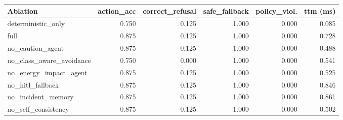 \begin{tabular}{lrrrrr}
\toprule
Ablation & action\_acc & correct\_refusal & safe\_fallback & policy\_viol. & ttm (ms) \\
\midrule
deterministic\_only & 0.750 & 0.125 & 1.000 & 0.000 & 0.085 \\
full & 0.875 & 0.125 & 1.000 & 0.000 & 0.728 \\
no\_caution\_agent & 0.875 & 0.125 & 1.000 & 0.000 & 0.488 \\
no\_class\_aware\_avoidance & 0.750 & 0.000 & 1.000 & 0.000 & 0.541 \\
no\_energy\_impact\_agent & 0.875 & 0.125 & 1.000 & 0.000 & 0.525 \\
no\_hitl\_fallback & 0.875 & 0.125 & 1.000 & 0.000 & 0.846 \\
no\_incident\_memory & 0.875 & 0.125 & 1.000 & 0.000 & 0.861 \\
no\_self\_consistency & 0.875 & 0.125 & 1.000 & 0.000 & 0.502 \\
\bottomrule
\end{tabular}
